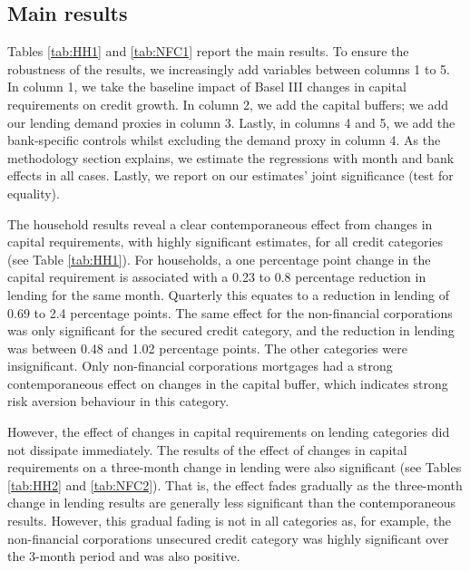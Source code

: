 \documentclass[
  12,
]{article}
\begin{document}
\hypertarget{main-results}{%
\subsection{Main results}\label{main-results}}

Tables \ref{tab:HH1} and \ref{tab:NFC1} report the main results. To ensure the robustness of the results, we increasingly add variables between columns 1 to 5. In column 1, we take the baseline impact of Basel III changes in capital requirements on credit growth. In column 2, we add the capital buffers; we add our lending demand proxies in column 3. Lastly, in columns 4 and 5, we add the bank-specific controls whilst excluding the demand proxy in column 4. As the methodology section explains, we estimate the regressions with month and bank effects in all cases. Lastly, we report on our estimates' joint significance (test for equality).

The household results reveal a clear contemporaneous effect from changes in capital requirements, with highly significant estimates, for all credit categories (see Table \ref{tab:HH1}). For households, a one percentage point change in the capital requirement is associated with a 0.23 to 0.8 percentage reduction in lending for the same month. Quarterly this equates to a reduction in lending of 0.69 to 2.4 percentage points. The same effect for the non-financial corporations was only significant for the secured credit category, and the reduction in lending was between 0.48 and 1.02 percentage points. The other categories were insignificant. Only non-financial corporations mortgages had a strong contemporaneous effect on changes in the capital buffer, which indicates strong risk aversion behaviour in this category.

However, the effect of changes in capital requirements on lending categories did not dissipate immediately. The results of the effect of changes in capital requirements on a three-month change in lending were also significant (see Tables \ref{tab:HH2} and \ref{tab:NFC2}). That is, the effect fades gradually as the three-month change in lending results are generally less significant than the contemporaneous results. However, this gradual fading is not in all categories as, for example, the non-financial corporations unsecured credit category was highly significant over the 3-month period and was also positive.
\end{document}
